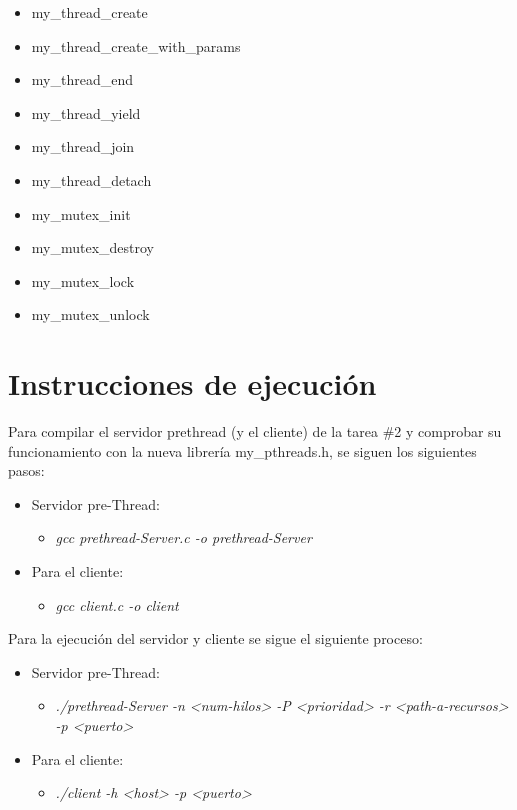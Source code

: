 \documentclass{article}
\let\<\textless
\let\>\textgreater
\begin{document}
\begin{itemize}
  \item my\_thread\_create
  \item my\_thread\_create\_with\_params
  \item my\_thread\_end
  \item my\_thread\_yield
  \item my\_thread\_join
  \item my\_thread\_detach
  \item my\_mutex\_init
  \item my\_mutex\_destroy
  \item my\_mutex\_lock
  \item my\_mutex\_unlock
\end{itemize}

\section{Instrucciones de ejecuci\'on}
Para compilar el servidor prethread (y el cliente) de la tarea \#2 y comprobar su funcionamiento con la nueva librer\'ia my\_pthreads.h, se siguen los siguientes pasos:
\begin{itemize}
  \item Servidor pre-Thread:
  \begin{itemize}
    \item \emph{gcc prethread-Server.c -o prethread-Server}
  \end{itemize}
  \item Para el cliente:
  \begin{itemize}
    \item \emph{gcc client.c -o client}
  \end{itemize}
\end{itemize}

Para la ejecuci\'on del servidor y cliente se sigue el siguiente proceso:
\begin{itemize}
  \item Servidor pre-Thread:
  \begin{itemize}
    \item \emph{./prethread-Server -n \<num-hilos\> -P \<prioridad\> -r \<path-a-recursos\> -p \<puerto\>}
  \end{itemize}
  \item Para el cliente:
  \begin{itemize}
    \item \emph{./client -h \<host\> -p \<puerto\>}
  \end{itemize}
\end{itemize}
\end{document}
